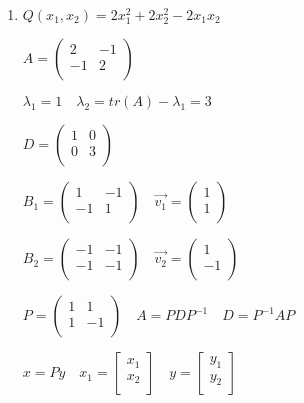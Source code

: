 \documentclass[12pt,letterpaper]{article}
\begin{document}
    \begin{enumerate}[label=(\alph*)]
        \item
        $Q(x_1, x_2) = 2x_1^2 + 2x_2^2 - 2x_1x_2$
        
        $A = \begin{pmatrix}
            2 & -1 \\
            -1 & 2 \\
        \end{pmatrix}$ 
        
        $\lambda_1 = 1\quad\lambda_2 = tr(A) - \lambda_1 = 3$
        
        $D = \begin{pmatrix}
            1 & 0 \\
            0 & 3 \\
        \end{pmatrix}$
        
        $B_1 = \begin{pmatrix}
            1 & -1 \\
            -1 & 1 \\
        \end{pmatrix}\quad \vec{v_1} = \begin{pmatrix}
            1 \\
            1 \\
        \end{pmatrix}$
        
        $B_2 = \begin{pmatrix}
            -1 & -1 \\
            -1 & -1 \\
        \end{pmatrix}\quad \vec{v_2} = \begin{pmatrix}
            1 \\
            -1 \\
        \end{pmatrix}$
        
        $P = \begin{pmatrix}
            1 & 1 \\
            1 & -1 \\
        \end{pmatrix}\quad A = PDP^{-1}\quad D = P^{-1}AP$
        
        $x = Py\quad x_1 = \begin{bmatrix}
            x_1 \\
            x_2 \\
        \end{bmatrix} \quad y = \begin{bmatrix}
            y_1 \\
            y_2 \\
        \end{bmatrix}$
        

\end{enumerate}
\end{document}
